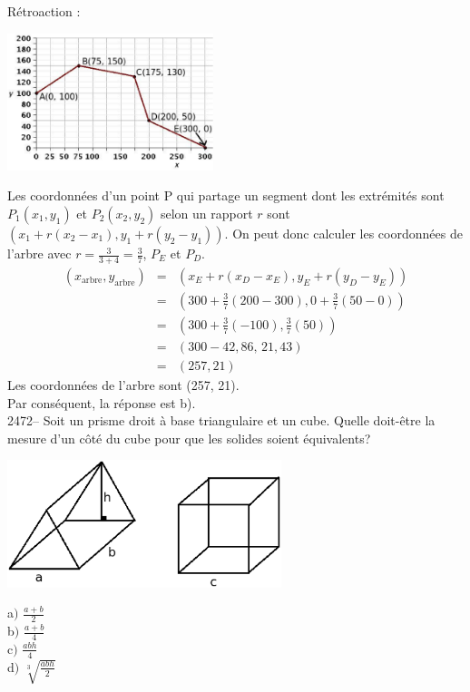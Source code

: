 \documentclass[letterpaper, 12pt]{article}
\begin{document}
R\'etroaction :\\
\begin{center}
 \includegraphics[width=6cm,bb=14 14 531 362]{Q2468.eps}
\end{center}
Les coordonn\'ees d'un point P qui partage un segment dont les extr\'emit\'es sont $P_{1}(x_{1}, y_{1})$ et $P_{2}(x_{2}, y_{2})$ selon un rapport $r$ sont $\left( x_{1}+r(x_{2}-x_{1}), y_{1}+r(y_{2}-y_{1})\right) $. On peut donc calculer les coordonn\'ees de l'arbre avec $r=\frac{3}{3+4}=\frac{3}{7}$, $P_{E}$ et $P_{D}$.
\begin{eqnarray*}
(x_{\textrm{arbre}}, y_{\textrm{arbre}})&=& \left( x_{E}+r(x_{D}-x_{E}), y_{E}+r(y_{D}-y_{E})\right)\\
&=& \left( 300+\frac{3}{7}(200-300), 0+\frac{3}{7}(50-0)\right)\\
&=& \left( 300+\frac{3}{7}(-100), \frac{3}{7}(50)\right)\\
&=& \left( 300-42,86,\, 21,43\right)\\
&=& \left( 257, 21\right)
\end{eqnarray*}
Les coordonn\'ees de l'arbre sont (257, 21).\\
Par cons\'equent, la r\'eponse est b).\\


2472-- Soit un prisme droit \`a base triangulaire et un cube. Quelle doit-\^etre la mesure d'un c\^ot\'e du cube pour que les solides soient \'equivalents?
\begin{center}
 \includegraphics[width=8cm,bb=0 536 571 842]{Q2472.eps}
\end{center}
a$)$ $\frac{a+b}{2}$\\[2mm]
b$)$ $\frac{a+b}{4}$\\[2mm]
c$)$ $\frac{abh}{4}$\\[2mm]
d$)$ $\sqrt[3]{\frac{abh}{2} }$\\[2mm]
\end{document}
